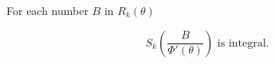 For each number $B$ in $R_k(\theta)$

$$S_k\left(\frac{B}{\Phi'(\theta)}\right) \text{ is integral.}$$
